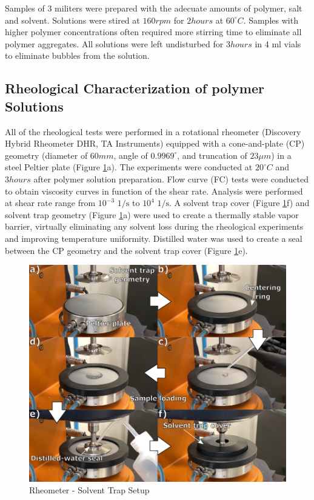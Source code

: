 Samples of 3 militers were prepared with the adecuate amounts of polymer, salt and solvent. Solutions were stired at $160 rpm$ for $2 hours$ at $60^{\circ}C$. Samples with higher polymer concentrations often required more stirring time to eliminate all polymer aggregates. All solutions were left undisturbed for $3 hours$ in 4 ml vials to eliminate bubbles from the solution.

\subsection{Rheological Characterization of polymer Solutions}
All of the rheological tests were performed in a rotational rheometer (Discovery Hybrid Rheometer DHR, TA Instruments) equipped with a cone-and-plate (CP) geometry (diameter of $60 mm$, angle of $0.9969^{\circ}$, and truncation of $23 \mu m$) in a steel Peltier plate (Figure \ref{fig:solventTrap}a). The experiments were conducted at $20^{\circ}C$ and $3 hours$ after polymer solution preparation. Flow curve (FC) tests were conducted to obtain viscosity curves in function of the shear rate. Analysis were performed at shear rate range from $10^{-3} \textrm{ 1} / \textrm{s}$ to $10^{4} \textrm{ 1} / \textrm{s}$. A solvent trap cover (Figure \ref{fig:solventTrap}f) and solvent trap geometry (Figure \ref{fig:solventTrap}a) were used to create a thermally stable vapor barrier, virtually eliminating any solvent loss during the rheological experiments and improving temperature uniformity. Distilled water was used to create a seal between the CP geometry and the solvent trap cover (Figure \ref{fig:solventTrap}e).

\begin{figure}[!th]
\centering
\includegraphics[scale=0.50]{./Figures/solventTrap.png}
\decoRule
\caption[Rheometer - Solvent Trap Setup]{Rheometer - Solvent Trap Setup}
\label{fig:solventTrap}
\end{figure}

